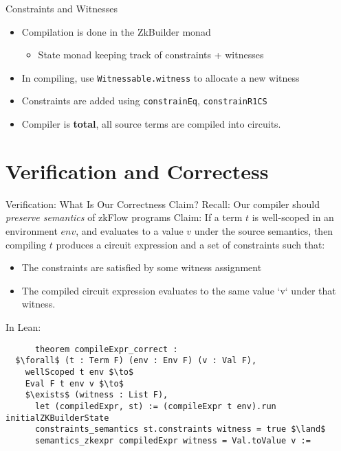 \documentclass[aspectratio=169]{beamer}
\begin{document}
  
    \begin{frame}[fragile]{Constraints and Witnesses}
    \vspace{-1em}
    \centering
        \begin{itemize}
          \item Compilation is done in the ZkBuilder monad
          \begin{itemize}
            \item State monad keeping track of constraints + witnesses
          \end{itemize}
          \item In compiling, use \texttt{Witnessable.witness} to allocate a new witness 
          \item Constraints are added using \texttt{constrainEq}, \texttt{constrainR1CS}
          \item Compiler is \textbf{total}, all source terms are compiled into circuits.
        \end{itemize}
    \end{frame}
    \section{Verification and Correctess}
    \begin{frame}[fragile]{Verification: What Is Our Correctness Claim?}
    \vspace{-1em}
    Recall: Our compiler should \textit{preserve semantics} of zkFlow programs 
    Claim:
    \centering 
    If a term $t$ is well-scoped in an environment $env$, and evaluates to a value $v$
    under the source semantics, then compiling $t$ produces a circuit expression and a
    set of constraints such that:
    \begin{itemize}
      \item The constraints are satisfied by some witness assignment
      \item The compiled circuit expression evaluates to the same value `v` under that witness.
    \end{itemize}
    In Lean:
    \begin{lstlisting}
      theorem compileExpr_correct :
  $\forall$ (t : Term F) (env : Env F) (v : Val F),
    wellScoped t env $\to$
    Eval F t env v $\to$
    $\exists$ (witness : List F),
      let (compiledExpr, st) := (compileExpr t env).run initialZKBuilderState
      constraints_semantics st.constraints witness = true $\land$
      semantics_zkexpr compiledExpr witness = Val.toValue v :=
    \end{lstlisting}
    
    \end{frame}
\end{document}
